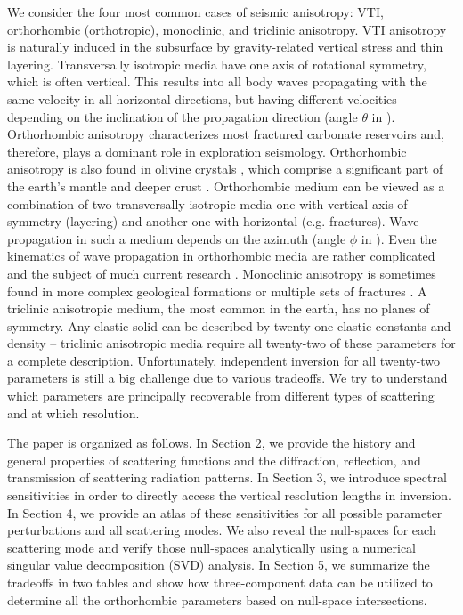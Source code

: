 We consider the four most common cases of seismic anisotropy: VTI, orthorhombic (orthotropic), monoclinic, and triclinic anisotropy.
VTI anisotropy is naturally induced in the subsurface by gravity-related vertical stress \citep{thomsen1986} and thin layering.
%
Transversally isotropic media have one axis of rotational symmetry, which is often vertical. This results into all body waves propagating with the same velocity in all horizontal directions, but having different velocities depending on the inclination of the propagation direction (angle $\theta$ in ).
Orthorhombic anisotropy characterizes most fractured carbonate reservoirs \citep{schoenberg1997,tsvankin1997} and, therefore, plays a dominant role in exploration seismology. Orthorhombic anisotropy is also found in olivine crystals \citep{durham1977}, which comprise a significant part of the earth's mantle and deeper crust \citep[e.g.][]{tommasi2009}. 
Orthorhombic medium can be viewed as a combination of two transversally isotropic media one with vertical axis of symmetry (layering) and another one with horizontal (e.g. fractures). Wave propagation in such a medium depends on the azimuth (angle $\phi$ in ). 
Even the kinematics of wave propagation in orthorhombic media are rather complicated and the subject of much current research \citep{stovas2015,stovas2017,ivanov2016,xu2018}. Monoclinic anisotropy is sometimes found in more complex geological formations or multiple sets of fractures \citep{grechka2000}. A triclinic anisotropic medium, the most common in the earth, has no planes of symmetry. Any elastic solid can be described by twenty-one elastic constants and density -- triclinic anisotropic media require all twenty-two of these parameters for a complete description. Unfortunately, independent inversion for all twenty-two parameters is still a big challenge \citep{kohn2015} due to various tradeoffs. We try to understand which parameters are principally recoverable from different types of scattering and at which resolution.

The paper is organized as follows. 
In Section 2, we provide the history and general properties of scattering functions and the diffraction, reflection, and transmission of scattering radiation patterns. In Section 3, we introduce spectral sensitivities in order to directly access the vertical resolution lengths in inversion. In Section 4, we provide an atlas of these sensitivities for all possible parameter perturbations and all scattering modes. We also reveal the null-spaces for each scattering mode and verify those null-spaces analytically using a numerical singular value decomposition (SVD) analysis. In Section 5, we summarize the tradeoffs in two tables and show how three-component data can be utilized to determine all the orthorhombic parameters based on null-space intersections.

